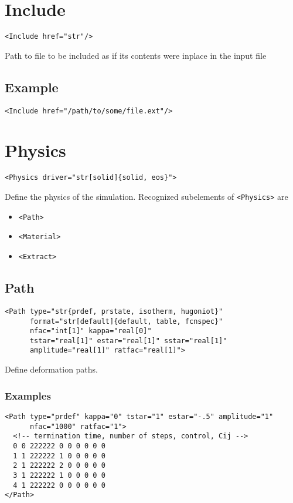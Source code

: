 \documentclass[11pt]{report}
\newcommand{\tag}[1]{\texttt{<#1>}}
\begin{document}
\section{Include}
\begin{verbatim}
<Include href="str"/>
\end{verbatim}
%
Path to file to be included as if its contents were inplace in the input file

\subsection{Example}
\begin{verbatim}
<Include href="/path/to/some/file.ext"/>
\end{verbatim}

\section{Physics}
\begin{verbatim}
<Physics driver="str[solid]{solid, eos}">
\end{verbatim}
%
Define the physics of the simulation. Recognized subelements of \tag{Physics}
are
%
\begin{itemize}
  \item \tag{Path}
  \item \tag{Material}
  \item \tag{Extract}
\end{itemize}

\subsection{Path}
\begin{verbatim}
<Path type="str{prdef, prstate, isotherm, hugoniot}"
      format="str[default]{default, table, fcnspec}"
      nfac="int[1]" kappa="real[0]"
      tstar="real[1]" estar="real[1]" sstar="real[1]"
      amplitude="real[1]" ratfac="real[1]">
\end{verbatim}
%
Define deformation paths.

\subsubsection{Examples}
\begin{verbatim}
<Path type="prdef" kappa="0" tstar="1" estar="-.5" amplitude="1"
      nfac="1000" ratfac="1">
  <!-- termination time, number of steps, control, Cij -->
  0 0 222222 0 0 0 0 0 0
  1 1 222222 1 0 0 0 0 0
  2 1 222222 2 0 0 0 0 0
  3 1 222222 1 0 0 0 0 0
  4 1 222222 0 0 0 0 0 0
</Path>
\end{verbatim}
\end{document}
